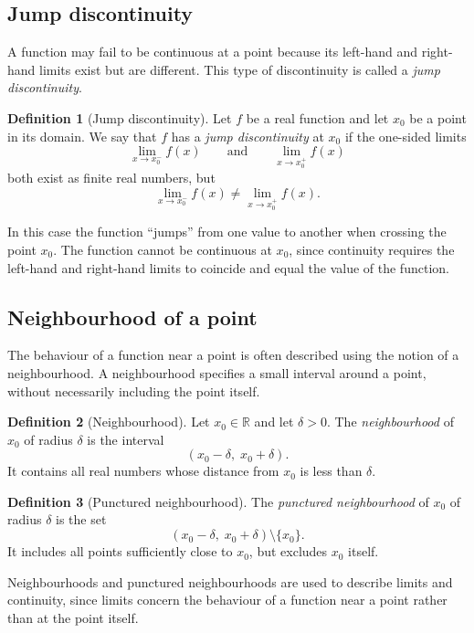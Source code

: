 \documentclass[11pt,a4paper]{article}
\theoremstyle{definition} \newtheorem{definition}{Definition} \theoremstyle{plain} \newtheorem{theorem}{Theorem}
\begin{document}
\subsection{Jump discontinuity}
A function may fail to be continuous at a point because its left-hand and right-hand limits exist but are different.
This type of discontinuity is called a \emph{jump discontinuity}.
\begin{definition}[Jump discontinuity] Let $f$ be a real function and let $x_0$ be a point in its domain.
We say that $f$ has a \emph{jump discontinuity} at $x_0$ if the one-sided limits
\[ \lim_{x \to x_0^-} f(x) \qquad \text{and} \qquad \lim_{x \to x_0^+} f(x) \]
both exist as finite real numbers, but
\[ \lim_{x \to x_0^-} f(x) \ne \lim_{x \to x_0^+} f(x). \]
\end{definition}
In this case the function ``jumps'' from one value to another when crossing the point $x_0$.
The function cannot be continuous at $x_0$, since continuity requires the left-hand and right-hand limits to coincide and equal the value of the function.
\subsection{Neighbourhood of a point}
The behaviour of a function near a point is often described using the notion of a neighbourhood.
A neighbourhood specifies a small interval around a point, without necessarily including the point itself.
\begin{definition}[Neighbourhood] Let $x_0 \in \mathbb{R}$ and let $\delta > 0$.
The \emph{neighbourhood} of $x_0$ of radius $\delta$ is the interval
\[ (x_0 - \delta,\; x_0 + \delta). \]
It contains all real numbers whose distance from $x_0$ is less than $\delta$. \end{definition}
\begin{definition}[Punctured neighbourhood] The \emph{punctured neighbourhood} of $x_0$ of radius $\delta$ is the set
\[ (x_0 - \delta,\; x_0 + \delta) \setminus \{x_0\}. \]
It includes all points sufficiently close to $x_0$, but excludes $x_0$ itself. \end{definition}
Neighbourhoods and punctured neighbourhoods are used to describe limits and continuity, since limits concern the behaviour of a function near a point rather than at the point itself.
\end{document}
